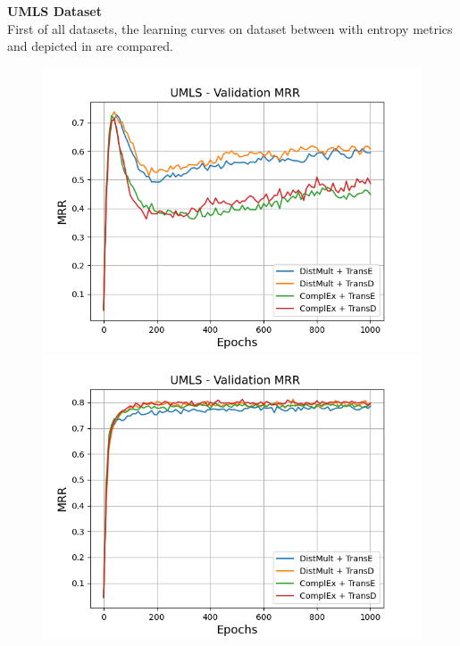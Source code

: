 \textbf{UMLS Dataset}
\label{subsubsec:uncertainty_umls}\\
%
First of all datasets, the learning curves on \umls dataset between \ussoftmax with entropy metrics and \origsampling depicted in  are compared.
\begin{figure}[H]
    \centering
    \begin{minipage}{.5\textwidth}
      \centering
      \includegraphics[width=0.9\linewidth]{figures/results/gan_train/not_pretrained/random/umls/epochs1000/random_umls_mrrs.png}
    \end{minipage}%
    \begin{minipage}{.5\textwidth}
      \centering
      \includegraphics[width=0.9\linewidth]{figures/results/gan_train/not_pretrained/uncertainty/max_distribution/entropy/umls/1k_epochs/uncertainty_umls_mrrs.png}

\end{minipage}
\end{figure}

